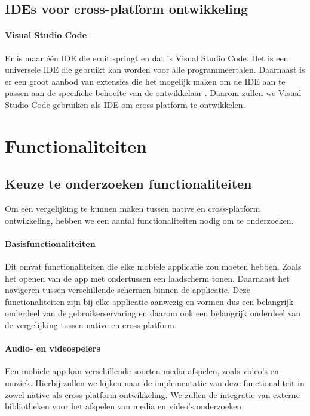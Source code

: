 \subsection{IDEs voor cross-platform ontwikkeling}

\paragraph{Visual Studio Code}
Er is maar één IDE die eruit springt en dat is Visual Studio Code. Het is een 
universele IDE die gebruikt kan worden voor alle programmeertalen. Daarnaast is er een 
groot aanbod van extensies die het mogelijk maken om de IDE aan te passen aan de 
specifieke behoefte van de ontwikkelaar \autocite{Heller2022}. Daarom zullen we Visual 
Studio Code gebruiken als IDE om cross-platform te ontwikkelen.

\section{Functionaliteiten}
\subsection{Keuze te onderzoeken functionaliteiten}
Om een vergelijking te kunnen maken tussen native en cross-platform ontwikkeling, 
hebben we een aantal functionaliteiten nodig om te onderzoeken. 

\paragraph{Basisfunctionaliteiten}
Dit omvat functionaliteiten die elke mobiele applicatie zou moeten hebben. Zoals 
het openen van de app met ondertussen een laadscherm tonen. Daarnaast het navigeren 
tussen verschillende schermen binnen de applicatie. Deze functionaliteiten zijn bij 
elke applicatie aanwezig en vormen dus een belangrijk onderdeel van de gebruikerservaring 
en daarom ook een belangrijk onderdeel van de vergelijking tussen native en cross-platform.

\paragraph{Audio- en videospelers}
Een mobiele app kan verschillende soorten media afspelen, zoals video's en muziek. 
Hierbij zullen we kijken naar de implementatie van deze functionaliteit in zowel native 
als cross-platform ontwikkeling. We zullen de integratie van externe bibliotheken voor 
het afspelen van media en video's onderzoeken.

